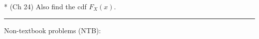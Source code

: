 \documentclass[12pt]{article}
\begin{document}

%



* (Ch 24) Also find the cdf $F_X(x)$.



\rule{500pt}{1pt}
\bigskip


 Non-textbook problems (NTB):          \label{NTB}

\begin{enumerate}  %


\end{enumerate}
\end{document}

